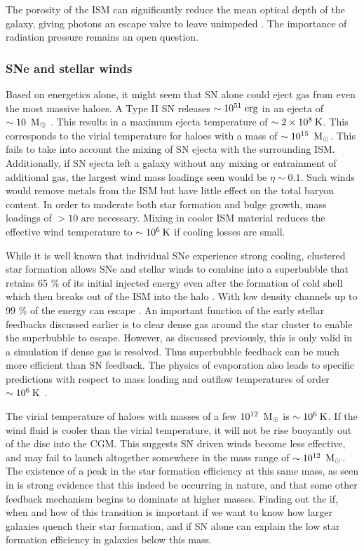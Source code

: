 The porosity of the ISM can significantly reduce the mean optical depth of the
galaxy, giving photons an escape valve to leave unimpeded \citep{Krumholz2013}.
The importance of radiation pressure remains an open question.

\subsubsection{SNe and stellar winds}
Based on energetics alone, it might seem that SN alone could eject gas from even
the most massive haloes.  A Type II SN releases $\sim10^{51}\;\rm{erg}$ in an
ejecta of $\sim10\;\>{\rm M_{\odot}}$ \citep{Leitherer1999}. This results in a maximum
ejecta temperature of $\sim2\times10^8\>{\rm K}$.  This corresponds to the virial
temperature for haloes with a mass of $\sim10^{15}\;\>{\rm M_{\odot}}$.  This fails to take
into account the mixing of SN ejecta with the surrounding ISM.   Additionally,
if SN ejecta left a galaxy without any mixing or entrainment of additional gas,
the largest wind mass loadings seen would be $\eta\sim0.1$.  Such winds would
remove metals from the ISM but have little effect on the total baryon content.
In order to moderate both star formation and bulge growth, mass loadings of
$>10$ are necessary.  Mixing in cooler ISM material reduces the effective wind
temperature to $\sim10^6\>{\rm K}$ if cooling losses are small.

While it is well known that individual SNe experience strong cooling,
clustered star formation allows SNe and stellar winds to combine into a
superbubble that retains 65 \% of its initial injected energy even after the
formation of cold shell which then breaks out of the ISM into the halo
\citep{MacLow1988}.  With low density channels up to 99 \% of the energy can
escape \citep{Rogers2013}.  An important function of the early stellar feedbacks
discussed earlier is to clear dense gas around the star cluster to enable the
superbubble to escape.  However, as discussed previously, this is only valid in
a simulation if dense gas is resolved.  Thus superbubble feedback can be much
more efficient than SN feedback.  The physics of evaporation also leads
to specific predictions with respect to mass loading and outflow temperatures
of order $\sim 10^6\>{\rm K}$ \citep{Keller2014}.

The virial temperature of haloes with masses of a few $10^{12}\;\>{\rm M_{\odot}}$ is
$\sim10^6\>{\rm K}$.  If the wind fluid is cooler than the virial temperature, it will
not be rise buoyantly out of the disc into the CGM.
This suggests SN driven winds become less effective, and may fail to launch
altogether somewhere in the mass range of $\sim10^{12}\;\>{\rm M_{\odot}}$. The existence of
a peak in the star formation efficiency at this same mass, as seen in
\citet{Behroozi2013} is strong evidence that this indeed be occurring in nature,
and that some other feedback mechanism begins to dominate at higher masses.
Finding out the if, when and how of this transition is important if we want to
know how larger galaxies quench their star formation, and if SN alone can
explain the low star formation efficiency in galaxies below this mass.

